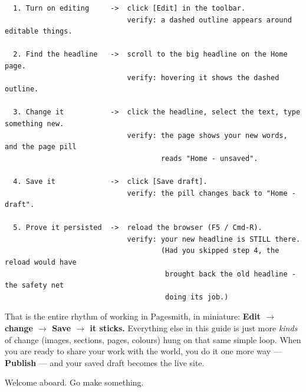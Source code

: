 \documentclass[11pt]{article}
\begin{document}
\begin{lstlisting}
  1. Turn on editing     ->  click [Edit] in the toolbar.
                             verify: a dashed outline appears around editable things.

  2. Find the headline   ->  scroll to the big headline on the Home page.
                             verify: hovering it shows the dashed outline.

  3. Change it           ->  click the headline, select the text, type something new.
                             verify: the page shows your new words, and the page pill
                                     reads "Home - unsaved".

  4. Save it             ->  click [Save draft].
                             verify: the pill changes back to "Home - draft".

  5. Prove it persisted  ->  reload the browser (F5 / Cmd-R).
                             verify: your new headline is STILL there.
                                     (Had you skipped step 4, the reload would have
                                      brought back the old headline - the safety net
                                      doing its job.)
\end{lstlisting}

That is the entire rhythm of working in Pagesmith, in miniature: \textbf{Edit
$\rightarrow$ change $\rightarrow$ Save $\rightarrow$ it sticks.} Everything else in
this guide is just more \emph{kinds} of change (images, sections, pages, colours) hung
on that same simple loop. When you are ready to share your work with the world, you do
it one more way --- \textbf{Publish} --- and your saved draft becomes the live site.

\bigskip
\noindent Welcome aboard. Go make something.
\end{document}
